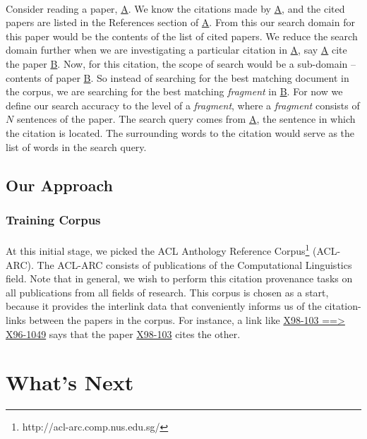 \documentclass[12 pt]{article}
\begin{document}
\paragraph{}
Consider reading a paper, \url{A}. We know the citations made by \url{A}, and the cited papers are listed in the References section of \url{A}. From this our search domain for this paper would be the contents of the list of cited papers. We reduce the search domain further when we are investigating a particular citation in \url{A}, say \url{A} cite the paper \url{B}. Now, for this citation, the scope of search would be a sub-domain -- contents of paper \url{B}. So instead of searching for the best matching document in the corpus, we are searching for the best matching \textit{fragment} in \url{B}. For now we define our search accuracy to the level of a \textit{fragment}, where a \textit{fragment} consists of $N$ sentences of the paper. The search query comes from \url{A}, the sentence in which the citation is located. The surrounding words to the citation would serve as the list of words in the search query.

\subsection{Our Approach}
\subsubsection{Training Corpus}
\paragraph{}
At this initial stage, we picked the ACL Anthology Reference Corpus\footnote{http://acl-arc.comp.nus.edu.sg/} (ACL-ARC). The ACL-ARC consists of publications of the Computational Linguistics field. Note that in general, we wish to perform this citation provenance tasks on all publications from all fields of research. This corpus is chosen as a start, because it provides the interlink data that conveniently informs us of the citation-links between the papers in the corpus. For instance, a link like \url{X98-103 ==> X96-1049} says that the paper \url{X98-103} cites the other.
\section{What's Next}

\end{document}
